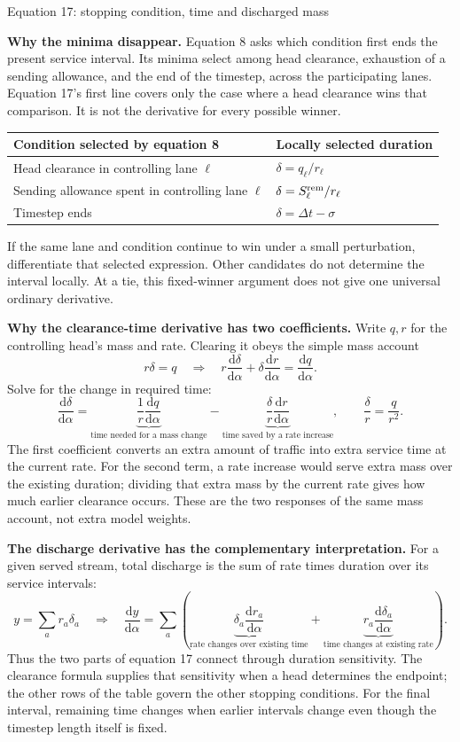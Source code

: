 \documentclass[11pt,a4paper]{article}
\newcommand{\der}[1]{\frac{\mathrm d #1}{\mathrm d\alpha}}
\begin{document}
\begin{center}
{\Large Equation 17: stopping condition, time and discharged mass}
\end{center}

\textbf{Why the minima disappear.}
Equation 8 asks which condition first ends the present service interval.
Its minima select among head clearance, exhaustion of a sending allowance,
and the end of the timestep, across the participating lanes. Equation 17's
first line covers only the case where a head clearance wins that comparison.
It is not the derivative for every possible winner.

\begin{center}
\renewcommand{\arraystretch}{1.35}
\begin{tabular}{@{}ll@{}}
\toprule
Condition selected by equation 8 & Locally selected duration\\
\midrule
Head clearance in controlling lane $\ell$ & $\delta=q_\ell/r_\ell$\\
Sending allowance spent in controlling lane $\ell$
 & $\delta=S_\ell^{\rm rem}/r_\ell$\\
Timestep ends & $\delta=\Delta t-\sigma$\\
\bottomrule
\end{tabular}
\end{center}
If the same lane and condition continue to win under a small perturbation,
differentiate that selected expression. Other candidates do not determine
the interval locally. At a tie, this fixed-winner argument does not give
one universal ordinary derivative.

\textbf{Why the clearance-time derivative has two coefficients.}
Write $q,r$ for the controlling head's mass and rate. Clearing it obeys
the simple mass account
\[
 r\delta=q
 \quad\Longrightarrow\quad
 r\der{\delta}+\delta\der{r}=\der{q}.
\]
Solve for the change in required time:
\[
 \boxed{\der{\delta}
 =\underbrace{\frac1r\der{q}}_{\text{time needed for a mass change}}
  -\underbrace{\frac{\delta}{r}\der{r}}_{\text{time saved by a rate increase}},
 \qquad \frac{\delta}{r}=\frac{q}{r^2}.}
\]
The first coefficient converts an extra amount of traffic into extra
service time at the current rate. For the second term, a rate increase
would serve extra mass over the existing duration; dividing that extra
mass by the current rate gives how much earlier clearance occurs. These
are the two responses of the same mass account, not extra model weights.

\textbf{The discharge derivative has the complementary interpretation.}
For a given served stream, total discharge is the sum of rate times
duration over its service intervals:
\[
 y=\sum_a r_a\delta_a
 \quad\Longrightarrow\quad
 \der{y}=\sum_a\left(
 \underbrace{\delta_a\der{r_a}}_{\text{rate changes over existing time}}
 +\underbrace{r_a\der{\delta_a}}_{\text{time changes at existing rate}}
 \right).
\]
Thus the two parts of equation 17 connect through duration sensitivity.
The clearance formula supplies that sensitivity when a head determines
the endpoint; the other rows of the table govern the other stopping
conditions. For the final interval, remaining time changes when earlier
intervals change even though the timestep length itself is fixed.
\end{document}

